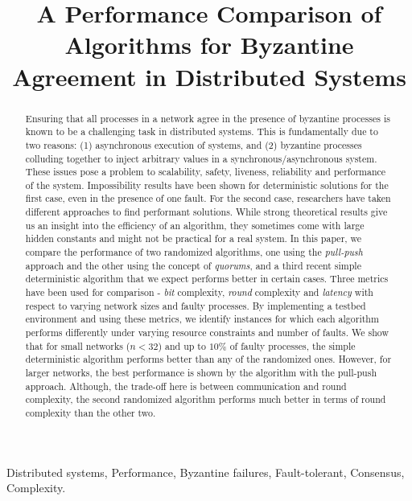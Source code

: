 \title{A Performance Comparison of Algorithms for Byzantine Agreement in Distributed Systems}

\author{}

%

\maketitle

\begin{abstract}

Ensuring that all processes in a network agree in the
presence of byzantine processes is known to be a challenging task in
distributed systems. This is fundamentally due to two reasons: (1)
asynchronous execution of systems, and (2) byzantine
processes colluding together to inject arbitrary values in a synchronous/asynchronous
system. These issues pose a problem to scalability, safety, liveness,
reliability and performance of the system. Impossibility results have
been shown for deterministic solutions for the first case, even in the
presence of one fault. For the second case, researchers have taken
different approaches to find performant solutions. While strong
theoretical results give us an insight into the efficiency of an
algorithm, they sometimes come with large hidden constants and might not
be practical for a real system. In this paper, we compare the 
performance of two randomized algorithms, one using the {\em pull-push} approach
and the other using the concept of {\em quorums}, and a third recent simple
deterministic algorithm that we expect performs
better in certain cases.
Three metrics have been used for comparison - {\em bit}
complexity, {\em round} complexity and {\em latency} with respect to varying network sizes and
faulty processes. By implementing a testbed environment and using these metrics, we identify instances for which each 
algorithm performs differently under varying resource constraints and
number of faults. We show that for small networks ($n<32$) and up to $10\%$ of faulty processes, the simple deterministic algorithm performs better than any of the randomized ones. However, for larger networks, the best performance is shown by the algorithm with the pull-push approach. Although, the trade-off here is between communication and round complexity, the second randomized algorithm performs much better in terms of round complexity than the other two. 

\end{abstract}

 Distributed systems, Performance, Byzantine failures, Fault-tolerant, Consensus, Complexity.
